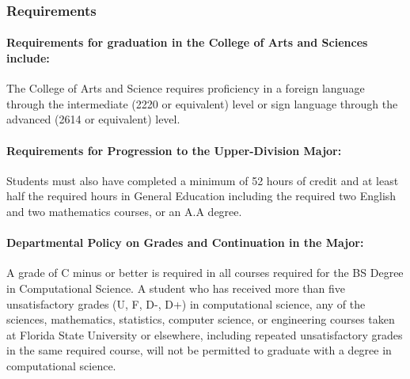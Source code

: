 \documentclass[12pt,a4paper]{article}
\begin{document}
\subsubsection*{Requirements}
\paragraph{Requirements for graduation in the College of Arts and Sciences include:} The College of Arts and Science requires proficiency in a foreign language through the intermediate (2220 or equivalent) level or sign language through the advanced (2614 or equivalent) level.

\paragraph{Requirements for Progression to the Upper-Division Major:} Students must also have completed a minimum of 52 hours of credit and at least half the required hours in General Education including the required two English and two mathematics courses, or an A.A degree.

\paragraph{Departmental Policy on Grades and Continuation in the Major:} A grade of C minus or better is required in all courses required for the BS Degree in Computational Science. A student who has received more than five unsatisfactory grades (U, F, D-, D+) in computational science, any of the sciences, mathematics, statistics, computer science, or engineering courses taken at Florida State University or elsewhere, including repeated unsatisfactory grades in the same required course, will not be permitted to graduate with a degree in computational science.
\end{document}
